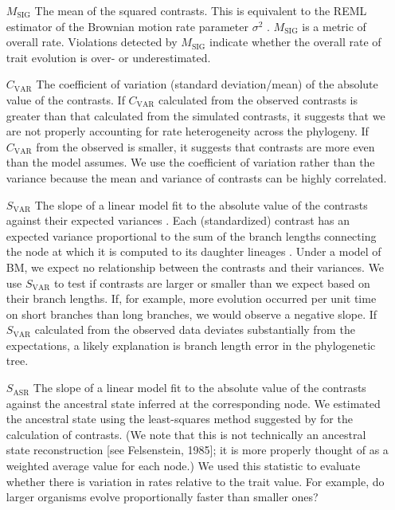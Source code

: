 \begin{enumerate}
\item[$M_{\text{SIG}}$] The mean of the squared contrasts. This is equivalent to the REML estimator of the Brownian motion rate parameter $\sigma^2$ \citep{Garland1992, Rohlf2001}. $M_{\text{SIG}}$ is a metric of overall rate. Violations detected by $M_{\text{SIG}}$ indicate whether the overall rate of trait evolution is over- or underestimated.

\item[$C_{\text{VAR}}$] The coefficient of variation (standard deviation/mean) of the absolute value of the contrasts. If $C_{\text{VAR}}$ calculated from the observed contrasts is greater than that calculated from the simulated contrasts, it suggests that we are not properly accounting for rate heterogeneity across the phylogeny. If $C_{\text{VAR}}$ from the observed is smaller, it suggests that contrasts are more even than the model assumes. We use the coefficient of variation rather than the variance because the mean and variance of contrasts can be highly correlated.

\item[$S_{\text{VAR}}$] The slope of a linear model fit to the absolute value of the contrasts against their expected variances \citep[following][]{Garland1992}. Each (standardized) contrast has an expected variance proportional to the sum of the branch lengths connecting the node at which it is computed to its daughter lineages  \citep{Felsenstein1985}. Under a model of BM, we expect no relationship between the contrasts and their variances. We use $S_{\text{VAR}}$ to test if contrasts are larger or smaller than we expect based on their branch lengths. If, for example, more evolution occurred per unit time on short branches than long branches, we would observe a negative slope. If $S_{\text{VAR}}$ calculated from the observed data deviates substantially from the expectations, a likely explanation is branch length error in the phylogenetic tree. 

\item[$S_{\text{ASR}}$] The slope of a linear model fit to the absolute value of the contrasts against the ancestral state inferred at the corresponding node. We estimated the ancestral state using the least-squares method suggested by \citet{Felsenstein1985} for the calculation of contrasts. (We note that this is not technically an ancestral state reconstruction [see Felsenstein, 1985]; it is more properly thought of as a weighted average value for each node.) We used this statistic to evaluate whether there is variation in rates relative to the trait value. For example, do larger organisms evolve proportionally faster than smaller ones?


\end{enumerate}

